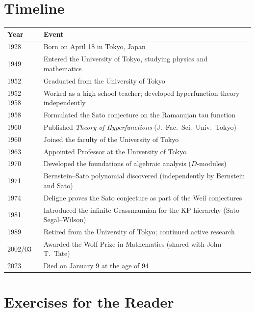 \section*{Timeline}
\begin{tabularx}{\linewidth}{|p{1.5cm}|>{\raggedright\arraybackslash}X|}
\hline
\textbf{Year} & \textbf{Event} \\ \hline
1928 & Born on April 18 in Tokyo, Japan \\ \hline
1949 & Entered the University of Tokyo, studying physics and mathematics \\ \hline
1952 & Graduated from the University of Tokyo \\ \hline
1952--1958 & Worked as a high school teacher; developed hyperfunction theory independently \\ \hline
1958 & Formulated the Sato conjecture on the Ramanujan tau function \\ \hline
1960 & Published \textit{Theory of Hyperfunctions} (J.\ Fac.\ Sci.\ Univ.\ Tokyo) \\ \hline
1960 & Joined the faculty of the University of Tokyo \\ \hline
1963 & Appointed Professor at the University of Tokyo \\ \hline
1970 & Developed the foundations of algebraic analysis (\(D\)-modules) \\ \hline
1971 & Bernstein--Sato polynomial discovered (independently by Bernstein and Sato) \\ \hline
1974 & Deligne proves the Sato conjecture as part of the Weil conjectures \\ \hline
1981 & Introduced the infinite Grassmannian for the KP hierarchy (Sato--Segal--Wilson) \\ \hline
1989 & Retired from the University of Tokyo; continued active research \\ \hline
2002/03 & Awarded the Wolf Prize in Mathematics (shared with John T.\ Tate) \\ \hline
2023 & Died on January 9 at the age of 94 \\ \hline
\end{tabularx}

\section*{Exercises for the Reader}

